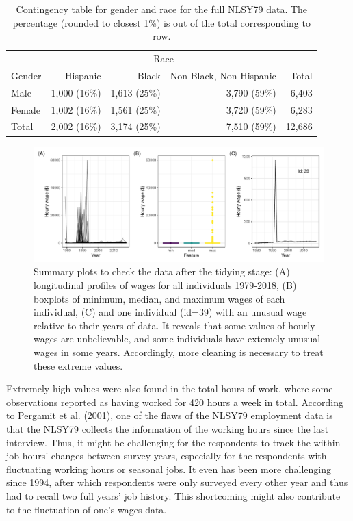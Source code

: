 \documentclass{article}
\begin{document}
\begin{table}

\caption{\label{tab:gender-race-table}Contingency table for gender and race for the full NLSY79 data. The percentage (rounded to closest 1\%) is out of the total corresponding to row.}
\centering
\begin{tabular}[t]{lrrrr}
\toprule
\multicolumn{1}{c}{ } & \multicolumn{3}{c}{Race} & \multicolumn{1}{c}{ } \\
\cmidrule(l{3pt}r{3pt}){2-4}
Gender & Hispanic & Black & Non-Black, Non-Hispanic & Total\\
\midrule
Male & 1,000 (16\%) & 1,613 (25\%) & 3,790 (59\%) & 6,403\\
Female & 1,002 (16\%) & 1,561 (25\%) & 3,720 (59\%) & 6,283\\
\midrule
Total & 2,002 (16\%) & 3,174 (25\%) & 7,510 (59\%) & 12,686\\
\bottomrule
\end{tabular}
\end{table}

\begin{figure}

{\centering \includegraphics[width=1\linewidth]{figures/feature-plot-1} 

}

\caption{Summary plots to check the data after the tidying stage: (A) longitudinal profiles of wages for all individuals 1979-2018, (B) boxplots of minimum, median, and maximum wages of each individual, (C) and one individual (id=39) with an unusual wage relative to their years of data. It reveals that some values of hourly wages are unbelievable, and some individuals have extemely unusual wages in some years. Accordingly, more cleaning is necessary to treat these extreme values.}\label{fig:feature-plot}
\end{figure}

Extremely high values were also found in the total hours of work, where some observations reported as having worked for 420 hours a week in total. According to Pergamit et al. (2001), one of the flaws of the NLSY79 employment data is that the NLSY79 collects the information of the working hours since the last interview. Thus, it might be challenging for the respondents to track the within-job hours' changes between survey years, especially for the respondents with fluctuating working hours or seasonal jobs. It even has been more challenging since 1994, after which respondents were only surveyed every other year and thus had to recall two full years' job history. This shortcoming might also contribute to the fluctuation of one's wages data.
\end{document}
